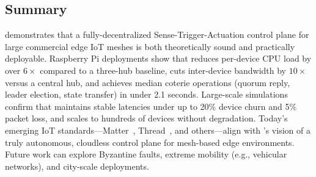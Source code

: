 \subsection{Summary}
\label{comesh:section:conclusion}

\sysname{} demonstrates that a fully-decentralized Sense-Trigger-Actuation control plane for large commercial edge IoT meshes is both theoretically sound and practically deployable.
Raspberry Pi deployments show that \sysname{} reduces per-device CPU load by over $6\times$ compared to a three-hub baseline, cuts inter-device bandwidth by $10\times$ versus a central hub, and achieves median coterie operations (quorum reply, leader election, state transfer) in under 2.1 seconds.
Large-scale simulations confirm that \sysname{} maintains stable latencies under up to 20\% device churn and 5\% packet loss, and scales to hundreds of devices without degradation.
Today's emerging IoT standards---Matter~\cite{csa2025matter}, Thread~\cite{thread2020fundamentals}, and others---align with \sysname's vision of a truly autonomous, cloudless control plane for mesh-based edge environments.
Future work can explore Byzantine faults, extreme mobility (e.g., vehicular networks), and city-scale deployments.
